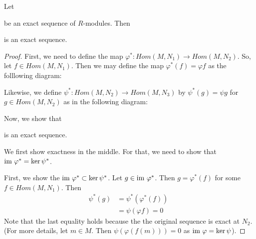 \begin{proposition}
    Let
    be an exact sequence of $R$-modules. Then \\
    is an exact sequence.
    \label{prop:left-exact-Hom-functor}
\end{proposition}
\begin{proof}
    First, we need to define the map $\varphi ^{*} : Hom (M, N_1 ) \to Hom (M, N_2)$. So, let $f \in Hom \left( M, N_1 \right)$. Then we may define the map $\varphi ^{*} (f) = \varphi f$ as the folllowing diagram:
    Likewise, we define $\psi^{*} : Hom (M, N_2 ) \to Hom (M, N_3)$ by $\psi ^{*} (g) = \psi g$ for $g\in Hom (M, N_2)$ as in the following diagram: 

    Now, we show that  is an exact sequence.

    We first show exactness in the middle. For that, we need to show that ${\text{im }} \varphi^{*} = \ker \psi ^{*}$.

    First, we show the ${\text{im }} \varphi ^{*} \subset \ker \psi ^{*}$. Let $g \in {\text{im }} \varphi ^{*}$. Then $g = \varphi ^{*} \left( f \right)$ for some $f\in Hom (M, N_1)$. Then 
    \begin{align*}
	\psi ^{*} (g) &= \psi ^{*} (\varphi ^{*} (f)) \\
	&= \psi (\varphi f) = 0
    \end{align*}
    Note that the last equality holds because the the original sequence is exact at $N_2$. (For more details, let $m \in M$. Then $\psi ( \varphi (f(m)))= 0$ as ${\text{im }} \varphi = \ker \psi$).


\end{proof}
